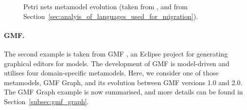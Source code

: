 \begin{figure}[htbp]
	\centering
	\caption[Exemplar metamodel evolution (Petri nets)]{Petri nets metamodel evolution (taken from \cite{rose10flock}, and from Section~\ref{sec:analyis_of_languages_used_for_migration}).}
\label{fig:petri_nets_mms_repeated}
\end{figure}

\paragraph{GMF.}
The second example is taken from GMF \cite{gronback09emp}, an Eclipse project for generating graphical editors for models. The development of GMF is model-driven and utilises four domain-specific metamodels. Here, we consider one of those metamodels, GMF Graph, and its evolution between GMF versions 1.0 and 2.0. The GMF Graph example is now summarised, and more details can be found in Section~\ref{subsec:gmf_graph}.

